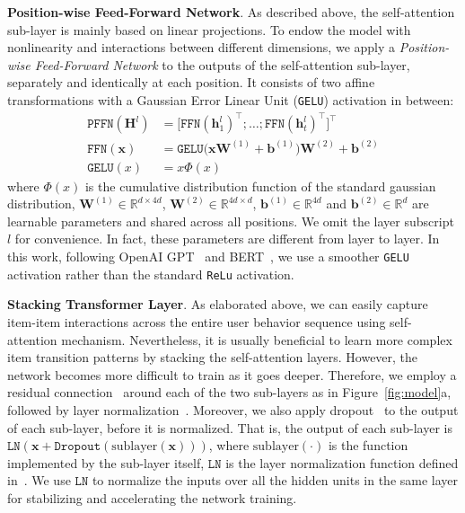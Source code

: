 \textbf{Position-wise Feed-Forward Network}.
As described above, the self-attention sub-layer is mainly based on linear projections.
To endow the model with nonlinearity and interactions between different dimensions, we apply a \textit{Position-wise Feed-Forward Network} to the outputs of the self-attention sub-layer, separately and identically at each position.
It consists of two affine transformations with a Gaussian Error Linear Unit (\texttt{GELU}) activation in between:
\begin{equation}
    \begin{aligned}
      \texttt{PFFN}(\bm{H}^l) & = \bigl[\mathtt{FFN}(\bm{h}_1^{l})^{\top}; \dots; \mathtt{FFN}(\bm{h}_t^{l})^{\top}\bigr]^{\top}\\
       \mathtt{FFN}(\bm{x}) &= \texttt{GELU}\bigl(\bm{x} \bm{W}^{(1)}+\bm{b}^{(1)}\bigr)\bm{W}^{(2)} + \bm{b}^{(2)}\\
       \texttt{GELU}(x) &= x \Phi(x)
    \end{aligned}
    \label{eq:ffn}
\end{equation}
where $\Phi(x)$ is the cumulative distribution function of the standard gaussian distribution, $\bm{W}^{(1)}\in \mathbb{R}^{d\times 4d}$, $\bm{W}^{(2)}\in \mathbb{R}^{4d\times d}$, $\bm{b}^{(1)}\in \mathbb{R}^{4d}$ and $\bm{b}^{(2)}\in \mathbb{R}^{d}$ are learnable parameters and shared across all positions.
We omit the layer subscript $l$ for convenience.
In fact, these parameters are different from layer to layer.
In this work, following OpenAI GPT~\cite{Radford:2018:GPT} and BERT~\cite{Devlin:2018:BERT}, we use a smoother \texttt{GELU}~\cite{Hendrycks:gleu} activation rather than the standard \texttt{ReLu} activation. %


\textbf{Stacking Transformer Layer}.
As elaborated above, we can easily capture item-item interactions across the entire user behavior sequence using self-attention mechanism.
Nevertheless, it is usually beneficial to learn more complex item transition patterns by stacking the self-attention layers.
However, the network becomes more difficult to train as it goes deeper.
Therefore, we employ a residual connection~\cite{He:cvpr2016:resnet} around each of the two sub-layers as in Figure~\ref{fig:model}a, followed by layer normalization~\cite{Lei:Layer}.
Moreover, we also apply dropout~\cite{Srivastava:jmlr15:Dropout} to the output of each sub-layer, before it is normalized. %
That is, the output of each sub-layer is $\texttt{LN}(\bm{x} + \texttt{Dropout}(\text{sublayer}(\bm{x})))$, where $\text{sublayer}(\cdot)$ is the function implemented by the sub-layer itself, $\texttt{LN}$ is the layer normalization function defined in~\cite{Lei:Layer}. %
We use $\texttt{LN}$ to normalize the inputs over all the hidden units in the same layer for stabilizing and accelerating the network training.

